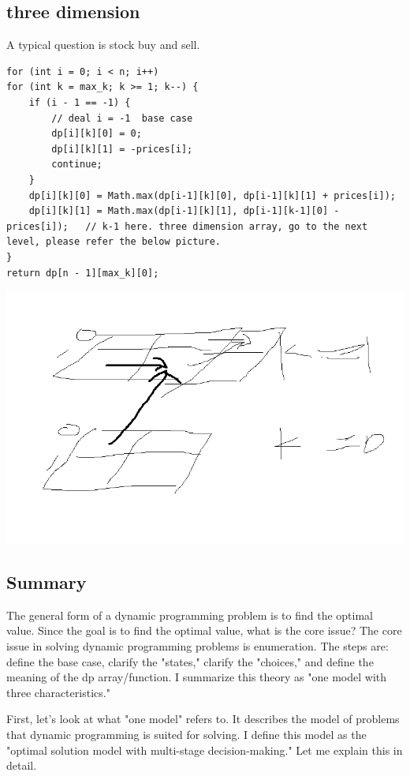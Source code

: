 \documentclass[a4paper,11pt,twoside]{book}
\begin{document}
\subsection{three dimension}
	\par A typical question is stock buy and sell. 
\begin{lstlisting}
for (int i = 0; i < n; i++) 
for (int k = max_k; k >= 1; k--) {
	if (i - 1 == -1) {
		// deal i = -1  base case
		dp[i][k][0] = 0;
		dp[i][k][1] = -prices[i];
		continue;
	}
	dp[i][k][0] = Math.max(dp[i-1][k][0], dp[i-1][k][1] + prices[i]);
	dp[i][k][1] = Math.max(dp[i-1][k][1], dp[i-1][k-1][0] - prices[i]);   // k-1 here. three dimension array, go to the next level, please refer the below picture.
}
return dp[n - 1][max_k][0];	
\end{lstlisting}	
	
\begin{center}
	\includegraphics[width=0.7\linewidth]{pics/stock.png} 
\end{center}
	

\subsection{Summary}


	\par The general form of a dynamic programming problem is to find the optimal value. Since the goal is to find the optimal value, what is the core issue? The core issue in solving dynamic programming problems is enumeration. The steps are: define the base case, clarify the "states," clarify the "choices," and define the meaning of the dp array/function. I summarize this theory as "one model with three characteristics."
	
	\par First, let's look at what "one model" refers to. It describes the model of problems that dynamic programming is suited for solving. I define this model as the "optimal solution model with multi-stage decision-making." Let me explain this in detail.
	
\end{document}
